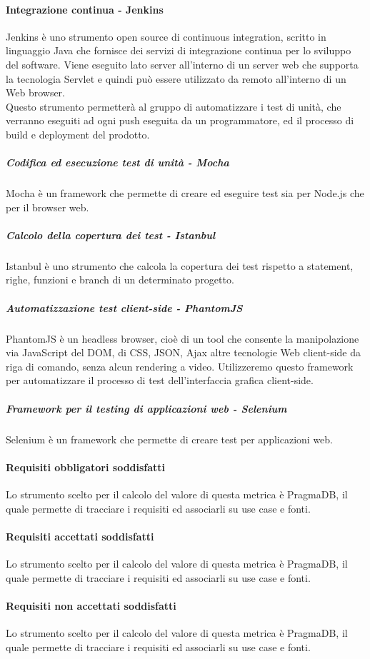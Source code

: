 \paragraph{Integrazione continua - Jenkins}
Jenkins è uno strumento open source di continuous integration, scritto in linguaggio Java che fornisce dei servizi di integrazione continua per lo sviluppo del software. Viene eseguito lato server all'interno di un server web che supporta la tecnologia Servlet e quindi può essere utilizzato da remoto all'interno di un Web browser.\\
Questo strumento permetterà al gruppo di automatizzare i test di unità, che verranno eseguiti ad ogni push eseguita da un programmatore, ed il processo di build e deployment del prodotto.
\subparagraph{Codifica ed esecuzione test di unità - Mocha}
Mocha è un framework che permette di creare ed eseguire test sia per Node.js che per il browser web.
\subparagraph{Calcolo della copertura dei test - Istanbul}
Istanbul è uno strumento che calcola la copertura dei test rispetto a statement, righe, funzioni e branch di un determinato progetto.
\subparagraph{Automatizzazione test client-side - PhantomJS}
PhantomJS è un headless browser, cioè di un tool che consente la manipolazione via JavaScript del DOM, di CSS, JSON, Ajax altre tecnologie Web client-side da riga di comando, senza alcun rendering a video. Utilizzeremo questo framework per automatizzare il processo di test dell'interfaccia grafica client-side.
\subparagraph{Framework per il testing di applicazioni web - Selenium}
Selenium è un framework che permette di creare test per applicazioni web.

\paragraph{Requisiti obbligatori soddisfatti}
Lo strumento scelto per il calcolo del valore di questa metrica è PragmaDB, il quale permette di tracciare i requisiti ed associarli su use case e fonti.
\paragraph{Requisiti accettati soddisfatti}
Lo strumento scelto per il calcolo del valore di questa metrica è PragmaDB, il quale permette di tracciare i requisiti ed associarli su use case e fonti.
\paragraph{Requisiti non accettati soddisfatti}
Lo strumento scelto per il calcolo del valore di questa metrica è PragmaDB, il quale permette di tracciare i requisiti ed associarli su use case e fonti.
